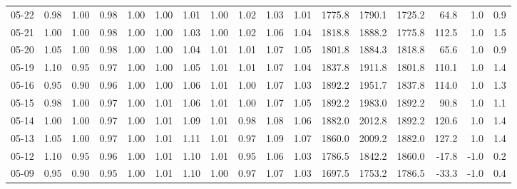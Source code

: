 \begin{threeparttable}
{\begin{tabular}{lrrrrrrrrrrrrrrrr}
  05-22 &   0.98 &   1.00 &         0.98 &     1.00 &           1.00 &        1.01 &        1.00 &        1.02 &          1.03 &          1.01 & 1775.8 & 1790.1 & 1725.2 &       64.8 &                      1.0 &                 0.9 \\
  05-21 &   1.00 &   1.00 &         0.98 &     1.00 &           1.00 &        1.03 &        1.00 &        1.02 &          1.06 &          1.04 & 1818.8 & 1888.2 & 1775.8 &      112.5 &                      1.0 &                 1.5 \\
  05-20 &   1.05 &   1.00 &         0.98 &     1.00 &           1.00 &        1.04 &        1.01 &        1.01 &          1.07 &          1.05 & 1801.8 & 1884.3 & 1818.8 &       65.6 &                      1.0 &                 0.9 \\
  05-19 &   1.10 &   0.95 &         0.97 &     1.00 &           1.00 &        1.05 &        1.01 &        1.01 &          1.07 &          1.04 & 1837.8 & 1911.8 & 1801.8 &      110.1 &                      1.0 &                 1.4 \\
  05-16 &   0.95 &   0.90 &         0.96 &     1.00 &           1.00 &        1.06 &        1.01 &        1.00 &          1.07 &          1.03 & 1892.2 & 1951.7 & 1837.8 &      114.0 &                      1.0 &                 1.3 \\
  05-15 &   0.98 &   1.00 &         0.97 &     1.00 &           1.01 &        1.06 &        1.01 &        1.00 &          1.07 &          1.05 & 1892.2 & 1983.0 & 1892.2 &       90.8 &                      1.0 &                 1.1 \\
  05-14 &   1.00 &   1.00 &         0.97 &     1.00 &           1.01 &        1.09 &        1.01 &        0.98 &          1.08 &          1.06 & 1882.0 & 2012.8 & 1892.2 &      120.6 &                      1.0 &                 1.4 \\
  05-13 &   1.05 &   1.00 &         0.97 &     1.00 &           1.01 &        1.11 &        1.01 &        0.97 &          1.09 &          1.07 & 1860.0 & 2009.2 & 1882.0 &      127.2 &                      1.0 &                 1.4 \\
  05-12 &   1.10 &   0.95 &         0.96 &     1.00 &           1.01 &        1.10 &        1.01 &        0.95 &          1.06 &          1.03 & 1786.5 & 1842.2 & 1860.0 &      -17.8 &                     -1.0 &                 0.2 \\
  05-09 &   0.95 &   0.90 &         0.95 &     1.00 &           1.01 &        1.10 &        1.00 &        0.97 &          1.07 &          1.03 & 1697.5 & 1753.2 & 1786.5 &      -33.3 &                     -1.0 &                 0.4 \\

\end{tabular}}
\end{threeparttable}
